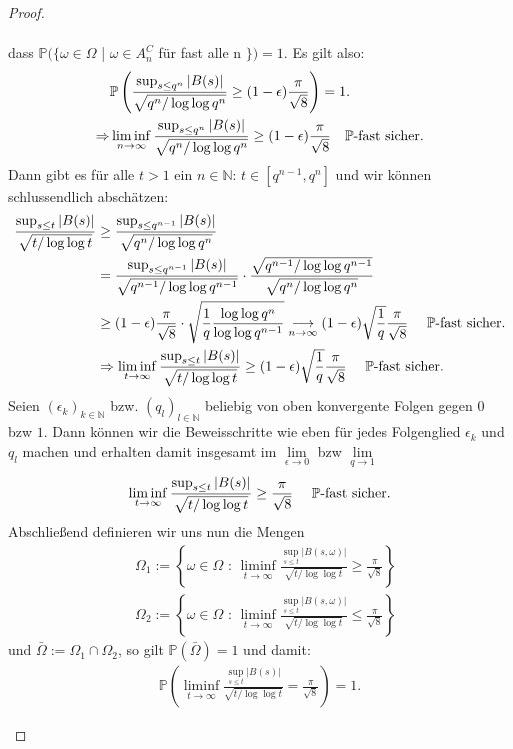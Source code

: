 \documentclass[12pt,a4paper]{scrartcl}
\numberwithin{equation}{section}
\newcommand{\N}{\mathbb{N}} %
\numberwithin{equation}{section}%
\theoremstyle{definition}
\begin{document}
\begin{proof}
\begin{itemize}
\begin{align*}
\end{align*}
 dass $\mathbb{P} (\{\omega \in \Omega$ | $ \omega \in A_n^C$ für fast alle n $\} ) = 1$. Es gilt also:
\begin{align*}
&\mathbb{P} \left( \frac{\sup_{s\leq q^n} \vert B(s)\vert }{\sqrt{q^n/\log\log q^n}} \geq (1-\epsilon) \frac{\pi}{\sqrt{8}} \right) = 1.\\
\Rightarrow &\liminf_{n\to\infty} \frac{\sup_{s\leq q^n} \vert B(s)\vert }{\sqrt{q^n/\log\log q^n}}\geq (1-\epsilon) \frac{\pi}{\sqrt{8}} \text{\quad $\mathbb{P}$-fast sicher}.
\end{align*}
Dann gibt es für alle $t> 1$ ein $n\in\N$: $t\in [q^{n-1},q^n]$ und wir können schlussendlich abschätzen:
\begin{align*}
\frac{\sup_{s\leq t} \vert B(s)\vert}{\sqrt{t/\log\log t}}
&\geq \frac{\sup_{s\leq q^{n-1}}\vert B(s)\vert}{\sqrt{q^n/\log\log q^n}}\\
&= \frac{\sup_{s\leq q^{n-1}}\vert B(s)\vert}{\sqrt{q^{n-1}/\log\log q^{n-1}}} \cdot \frac{\sqrt{q^{n-1}/\log\log q^{n-1}}}{\sqrt{q^n/\log\log q^n}}\\
&\geq (1-\epsilon) \frac{\pi}{\sqrt{8}}\cdot \sqrt{\frac{1}{q}\frac{\log\log q^n}{\log\log q^{n-1}}} \underset{n\to\infty}\longrightarrow (1-\epsilon) \sqrt{\frac{1}{q}}\frac{\pi}{\sqrt{8}} \text{ \quad } \mathbb{P} \text{-fast sicher.}\\
&\Rightarrow \liminf_{t\to\infty}\frac{\sup_{s\leq t} \vert B(s)\vert}{\sqrt{t/\log\log t}} \geq (1-\epsilon)\sqrt{\frac{1}{q}}\frac{\pi}{\sqrt{8}}\text{ \quad } \mathbb{P} \text{-fast sicher.}
\end{align*}
Seien $(\epsilon_k)_{k\in\N}$ bzw. $(q_l)_{l\in\N}$ beliebig von oben konvergente Folgen gegen $0$ bzw $1$.
Dann können wir die Beweisschritte wie eben für jedes Folgenglied $\epsilon_k$ und $q_l$ machen und erhalten damit insgesamt im $\lim\limits_{\epsilon \to 0}$ bzw $\lim\limits_{q\to 1}$
\begin{align*}
\liminf_{t\to\infty} \frac{\sup_{s\leq t} \vert B(s)\vert}{\sqrt{t/\log\log t}} \geq \frac{\pi}{\sqrt{8}} \text{ \quad} \mathbb{P} \text{-fast sicher}.
\end{align*}
Abschließend definieren wir uns nun die Mengen
\begin{align*}
&\Omega_1 := \left\{\omega \in \Omega \text{ : } \liminf_{t\to\infty}\frac{\sup_{s\leq t} \vert B(s,\omega)\vert}{\sqrt{t/\log\log t}} \geq \frac{\pi}{\sqrt{8}} \right\}\\
&\Omega_2 := \left\{\omega \in \Omega \text{ : } \liminf_{t\to\infty}\frac{\sup_{s\leq t} \vert B(s,\omega)\vert}{\sqrt{t/\log\log t}} \leq \frac{\pi}{\sqrt{8}} \right\}
\end{align*}
und $\bar{\Omega} := \Omega_1 \cap \Omega_2$, so gilt $\mathbb{P}(\bar{\Omega}) = 1$ und damit:
\begin{align*}
\mathbb{P} \left( \liminf\limits_{t\to\infty} \frac{\sup_{s\leq t}\vert B(s)\vert}{\sqrt{t/\log\log t}} = \frac{\pi}{\sqrt{8}} \right) = 1.
\end{align*}
\end{itemize}
\end{proof}
\end{document}
